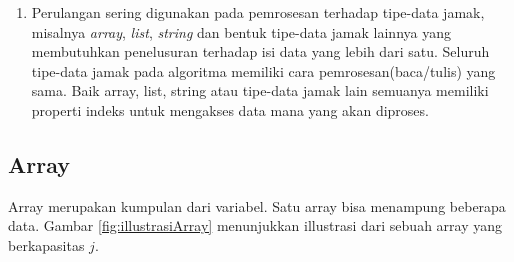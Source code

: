 \begin{enumerate}
\begin{contoh}
\begin{listprog}{PerintahJamakWhile.py}
\begin{lstlisting}[language=Python]
		#sama dengan jumlah = jumlah + nilai
		jumlah += nilai	 
				
		print(nilai)
		i += 1 #lihat petunjuk sebelumnya
	print(jumlah)
\end{lstlisting}
\end{listprog}
	\end{contoh}

Perhatikan bahwa ada kondisi-kondisi yang mempengaruhi kapan \textit{statement} perulangan  \textit{while} atau \textit{for} digunakan. Namun,  Perulangan \textit{while} atau \textit{for} dapat dikonversi menjadi struktur yang berbeda satu sama lain. Kita dapat melakukan konversi atas Contoh \ref{cth:PengulanganPerintahWhile} menjadi dalam bentuk perulangan  \textit{for} berikut : 

\begin{contoh}
	\label{cth:PengulanganPerintahFor}
	\textbf{Pengulangan perintah jamak (\textit{for})}
\begin{listprog}{PerintahJamakFor.py}
\label{lst:PerintahJamakFor}
\begin{lstlisting}[language=Python]
	negasi = -1
	jumlah = 0
	for i in range(5):
		negasi = -negasi
		nilai = negasi * (i+1) 
		jumlah += nilai					
		print(nilai)
	print(jumlah)
\end{lstlisting}
\end{listprog}
\end{contoh}

	\item Perulangan sering digunakan pada pemrosesan terhadap tipe-data jamak, misalnya \textit{array}, \textit{list}, \textit{string} dan bentuk tipe-data jamak lainnya yang membutuhkan penelusuran terhadap isi data yang lebih dari satu. Seluruh tipe-data jamak pada algoritma memiliki cara pemrosesan(baca/tulis) yang sama. Baik array, list, string atau tipe-data jamak lain semuanya memiliki properti indeks untuk mengakses data mana yang akan diproses.   
\end{enumerate}

\subsection{Array}
Array merupakan kumpulan dari variabel. Satu array bisa menampung beberapa data. Gambar \ref{fig:illustrasiArray} menunjukkan illustrasi dari sebuah array yang berkapasitas $j$. 

